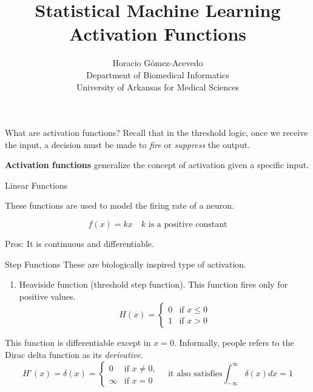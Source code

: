 \documentclass{beamer}
\title{Statistical Machine Learning\\ Activation Functions}
\author{Horacio G\'omez-Acevedo\\ Department of Biomedical Informatics\\
	University of Arkansas for Medical Sciences}
\begin{document}
	\begin{frame}[plain]
		\maketitle
	\end{frame}

\begin{frame}{What are activation functions?}
Recall that in the threshold logic,  once we receive the input, a decision must be made to \textit{fire} or \textit{suppress} the output. 


\textbf{Activation functions} generalize the concept of activation given a specific  input.

	
\end{frame}

\begin{frame}{Linear Functions}
	
	These functions are used to model the firing rate of a neuron.
	
	\begin{equation*}
		f(x)= kx \quad k \text{ is a positive constant}
	\end{equation*}

Pros: It is continuous and differentiable.	
	
\end{frame}

\begin{frame}{Step Functions}
	These are biologically inspired type of activation.
	
	\begin{enumerate}
		\item Heaviside function (threshold step function). This function fires only for positive values.
		\begin{equation*}
			H(x)=
			\begin{cases}
				0 & \text{if }x\le 0 \\
				1 & \text{if } x >0
			\end{cases}
		\end{equation*}
	
	\end{enumerate}
This function is differentiable except in $x=0$.  Informally, people refers to the Dirac delta function as its \textit{derivative}. 
\begin{equation*}
	H'(x)= \delta(x) =\begin{cases}
		0 & \text{if } x \ne 0,\\
		\infty & \text{if } x=0
	\end{cases} \quad \text{it also satisfies} \int_{-\infty}^{\infty} \delta(x)dx =1
\end{equation*}


\end{frame}
\end{document}

